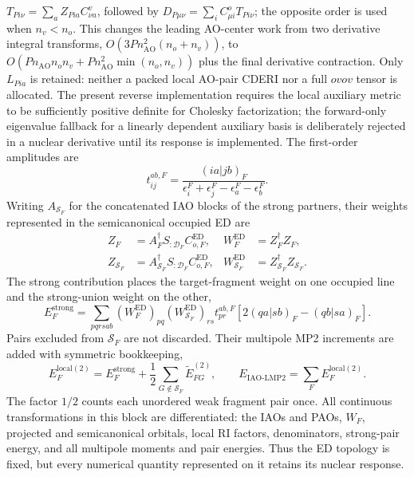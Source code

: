\documentclass[11pt]{article}
\begin{document}
$T_{Pi\nu}=\sum_a Z_{Pia}C^v_{\nu a}$, followed by
$D_{P\mu\nu}=\sum_i C^o_{\mu i}T_{Pi\nu}$; the opposite order is used when
$n_v<n_o$.  This changes the leading AO-center work from two derivative
integral transforms, $O(3Pn_{\mathrm{AO}}^2(n_o+n_v))$, to
$O(Pn_{\mathrm{AO}}n_on_v+Pn_{\mathrm{AO}}^2\min(n_o,n_v))$ plus the final
derivative contraction.  Only $L_{Pia}$ is retained: neither a packed local
AO-pair CDERI nor a full $ovov$ tensor is allocated.
The present reverse implementation requires the local auxiliary metric to be
sufficiently positive definite for Cholesky factorization; the forward-only
eigenvalue fallback for a linearly dependent auxiliary basis is deliberately
rejected in a nuclear derivative until its response is implemented.
The first-order amplitudes are
\begin{equation}
 t_{ij}^{ab,F}=
 \frac{(ia|jb)_F}
 {\epsilon_i^F+\epsilon_j^F-\epsilon_a^F-\epsilon_b^F}.
 \label{eq:workflow-domain-mp2-amplitude}
\end{equation}
Writing $A_{\mathcal S_F}$ for the concatenated IAO blocks of the strong
partners, their weights represented in the semicanonical occupied ED are
\begin{align}
 Z_F&=A_F^\dagger S_{:\mathcal D_F}C_{o,F}^{\mathrm{ED}}, &
 W_F^{\mathrm{ED}}&=Z_F^\dagger Z_F,\\
 Z_{\mathcal S_F}&=A_{\mathcal S_F}^\dagger
 S_{:\mathcal D_F}C_{o,F}^{\mathrm{ED}}, &
 W_{\mathcal S_F}^{\mathrm{ED}}
 &=Z_{\mathcal S_F}^\dagger Z_{\mathcal S_F}.
 \label{eq:workflow-ed-fragment-weights}
\end{align}
The strong contribution places the target-fragment weight on one occupied
line and the strong-union weight on the other,
\begin{equation}
 E_F^{\mathrm{strong}}=
 \sum_{pqrsab}
 (W_F^{\mathrm{ED}})_{pq}
 (W_{\mathcal S_F}^{\mathrm{ED}})_{rs}
 t_{pr}^{ab,F}
 \left[2(qa|sb)_F-(qb|sa)_F\right].
 \label{eq:workflow-weighted-strong-energy}
\end{equation}
Pairs excluded from $\mathcal S_F$ are not discarded.  Their multipole MP2
increments are added with symmetric bookkeeping,
\begin{equation}
 E_F^{\mathrm{local}(2)}=
 E_F^{\mathrm{strong}}+
 \frac12\sum_{G\notin\mathcal S_F}
 \widetilde E_{FG}^{(2)},
 \qquad
 E_{\mathrm{IAO\mbox{-}LMP2}}=\sum_F E_F^{\mathrm{local}(2)}.
 \label{eq:workflow-local-mp2-energy}
\end{equation}
The factor $1/2$ counts each unordered weak fragment pair once.  All
continuous transformations in this block are differentiated: the IAOs and
PAOs, $W_F$, projected and semicanonical orbitals, local RI factors,
denominators, strong-pair energy, and all multipole moments and pair energies.
Thus the ED topology is fixed, but every numerical quantity represented on it
retains its nuclear response.
\end{document}
